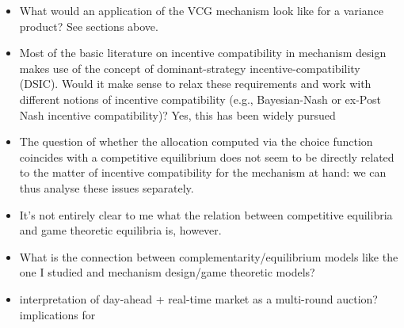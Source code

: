 \documentclass{article}
\begin{document}
\begin{itemize}
\item What would an application of the VCG mechanism look like for a variance product? See sections above.
\item Most of the basic literature on incentive compatibility in mechanism design makes use of the concept of dominant-strategy incentive-compatibility (DSIC). Would it make sense to relax these requirements and work with different notions of incentive compatibility (e.g., Bayesian-Nash or ex-Post Nash incentive compatibility)? Yes, this has been widely pursued
\item The question of whether the allocation computed via the choice function coincides with a competitive equilibrium does not seem to be directly related to the matter of incentive compatibility for the mechanism at hand: we can thus analyse these issues separately.
\item It's not entirely clear to me what the relation between competitive equilibria and game theoretic equilibria is, however.
\item What is the connection between complementarity/equilibrium models like the one I studied and mechanism design/game theoretic models?
\item interpretation of day-ahead + real-time market as a multi-round auction? implications for 
\end{itemize}


\end{document}
